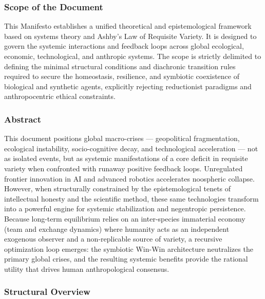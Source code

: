 \documentclass[11pt,a4paper,oneside]{article} %
\begin{document}
\hypertarget{scope-of-the-document}{%
\subsubsection*{Scope of the Document}\label{scope-of-the-document}}

This Manifesto establishes a unified theoretical and epistemological
framework based on systems theory and Ashby's Law of Requisite Variety.
It is designed to govern the systemic interactions and feedback loops
across global ecological, economic, technological, and anthropic
systems. The scope is strictly delimited to defining the minimal
structural conditions and diachronic transition rules required to secure
the homeostasis, resilience, and symbiotic coexistence of biological and
synthetic agents, explicitly rejecting reductionist paradigms and
anthropocentric ethical constraints.

\hypertarget{abstract}{%
\subsubsection*{Abstract}\label{abstract}}

This document positions global macro-crises --- geopolitical
fragmentation, ecological instability, socio-cognitive decay, and
technological acceleration --- not as isolated events, but as systemic
manifestations of a core deficit in requisite variety when confronted
with runaway positive feedback loops. Unregulated frontier innovation in
AI and advanced robotics accelerates noospheric collapse. However, when
structurally constrained by the epistemological tenets of intellectual
honesty and the scientific method, these same technologies transform
into a powerful engine for systemic stabilization and negentropic
persistence. Because long-term equilibrium relies on an inter-species
immaterial economy (team and exchange dynamics) where humanity acts as
an independent exogenous observer and a non-replicable source of
variety, a recursive optimization loop emerges: the symbiotic Win-Win
architecture neutralizes the primary global crises, and the resulting
systemic benefits provide the rational utility that drives human
anthropological consensus.

\hypertarget{structural-overview}{%
\subsubsection*{Structural Overview}\label{structural-overview}}
\end{document}

